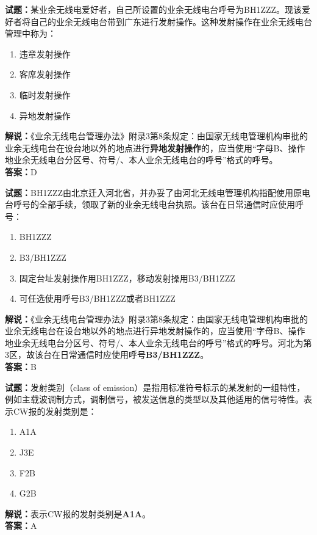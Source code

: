 \documentclass{ctexbook}
\begin{document}
\bigskip


\noindent\textbf{试题：}某业余无线电爱好者，自己所设置的业余无线电台呼号为BH1ZZZ。现该爱好者将自己的业余无线电台带到广东进行发射操作。这种发射操作在业余无线电台管理中称为：
\begin{enumerate}[leftmargin=3em]
\item 违章发射操作
\item 客席发射操作
\item 临时发射操作
\item 异地发射操作
\end{enumerate}
\noindent\textbf{解说：}《业余无线电台管理办法》附录3第8条规定：由国家无线电管理机构审批的业余无线电台在设台地以外的地点进行\textbf{异地发射操作}的，应当使用“字母B、操作地业余无线电台分区号、符号/、本人业余无线电台的呼号”格式的呼号。\\\noindent\textbf{答案：}D






\bigskip


\noindent\textbf{试题：}BH1ZZZ由北京迁入河北省，并办妥了由河北无线电管理机构指配使用原电台呼号的全部手续，领取了新的业余无线电台执照。该台在日常通信时应使用呼号：
\begin{enumerate}[leftmargin=3em]
\item BH1ZZZ
\item B3/BH1ZZZ
\item 固定台址发射操作用BH1ZZZ，移动发射操用B3/BH1ZZZ
\item 可任选使用呼号B3/BH1ZZZ或者BH1ZZZ
\end{enumerate}
\noindent\textbf{解说：}《业余无线电台管理办法》附录3第8条规定：由国家无线电管理机构审批的业余无线电台在设台地以外的地点进行异地发射操作的，应当使用“字母B、操作地业余无线电台分区号、符号/、本人业余无线电台的呼号”格式的呼号。河北为第3区，故该台在日常通信时应使用呼号\textbf{B3/BH1ZZZ}。\\\noindent\textbf{答案：}B




\bigskip


\noindent\textbf{试题：}发射类别（class of emission）是指用标准符号标示的某发射的一组特性，例如主载波调制方式，调制信号，被发送信息的类型以及其他适用的信号特性。表示CW报的发射类别是：
\begin{enumerate}[leftmargin=3em]
\item A1A
\item J3E
\item F2B
\item G2B
\end{enumerate}
\noindent\textbf{解说：}表示CW报的发射类别是\textbf{A1A}。\\\noindent\textbf{答案：}A
\end{document}
